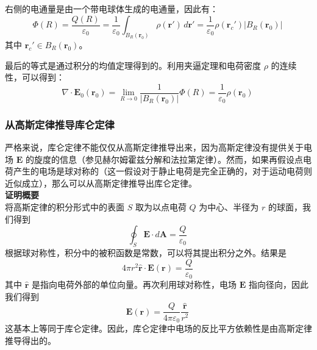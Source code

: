 右侧的电通量是由一个带电球体生成的电通量，因此有：
\[
\Phi(R) = \frac{Q(R)}{\varepsilon_0} = \frac{1}{\varepsilon_0} \int_{B_R(\mathbf{r}_0)} \rho(\mathbf{r'}) \, d\mathbf{r'} = \frac{1}{\varepsilon_0} \rho(\mathbf{r}_c') |B_R(\mathbf{r}_0)|~
\]
其中 \(\mathbf{r}_c' \in B_R(\mathbf{r}_0)\)。

最后的等式是通过积分的均值定理得到的。利用夹逼定理和电荷密度 \(\rho\) 的连续性，可以得到：
\[
\nabla \cdot \mathbf{E}_0(\mathbf{r}_0) = \lim_{R \to 0} \frac{1}{|B_R(\mathbf{r}_0)|} \Phi(R) = \frac{1}{\varepsilon_0} \rho(\mathbf{r}_0)~
\]
\subsubsection{从高斯定律推导库仑定律}

严格来说，库仑定律不能仅仅从高斯定律推导出来，因为高斯定律没有提供关于电场 \(\mathbf{E}\) 的旋度的信息（参见赫尔姆霍兹分解和法拉第定律）。然而，如果再假设点电荷产生的电场是球对称的（这一假设对于静止电荷是完全正确的，对于运动电荷则近似成立），那么可以从高斯定律推导出库仑定律。\\
\textbf{证明概要}\\
将高斯定律的积分形式中的表面 \( S \) 取为以点电荷 \( Q \) 为中心、半径为 \( r \) 的球面，我们得到
\[
\oint_S \mathbf{E} \cdot d\mathbf{A} = \frac{Q}{\varepsilon_0}~
\]
根据球对称性，积分中的被积函数是常数，可以将其提出积分之外。结果是
\[
4\pi r^2 \hat{\mathbf{r}} \cdot \mathbf{E} (\mathbf{r}) = \frac{Q}{\varepsilon_0}~
\]
其中 \( \hat{\mathbf{r}} \) 是指向电荷外部的单位向量。再次利用球对称性，电场 \( \mathbf{E} \) 指向径向，因此我们得到
\[
\mathbf{E} (\mathbf{r}) = \frac{Q}{4\pi \varepsilon_0} \frac{\hat{\mathbf{r}}}{r^2}~
\]
这基本上等同于库仑定律。因此，库仑定律中电场的反比平方依赖性是由高斯定律推导得出的。
